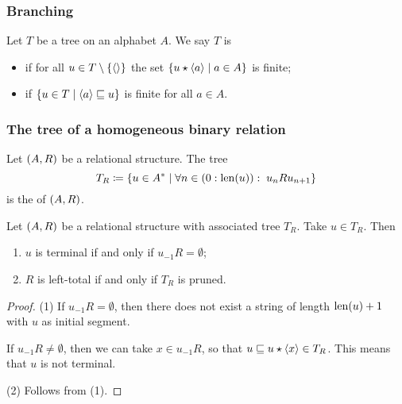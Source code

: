 \subsubsection{Branching}
\begin{definition}
Let $T$ be a tree on an alphabet $A$. We say $T$ is
\begin{itemize}
\item {} if for all $u\in T\setminus\{\left\langle  \right\rangle\}$ the set $\setbuilder{u\concat\seq{a}}{a\in A}$ is finite;
\item {} if $\setbuilder{u\in T}{\seq{a}\sqsubseteq u}$ is finite for all $a\in A$.
\end{itemize}
\end{definition}

\subsubsection{The tree of a homogeneous binary relation}
\begin{definition}
Let $\sSet{A,R}$ be a relational structure. The tree
\[ T_R \defeq \setbuilder{u\in A^*}{\forall n\in (0:\len(u)): \; u_nRu_{n+1}} \]
is the  of $\sSet{A,R}$.
\end{definition}

\begin{lemma} \label{relationalTreeLemma}
Let $\sSet{A,R}$ be a relational structure with associated tree $T_R$. Take $u\in T_R$. Then
\begin{enumerate}
\item $u$ is terminal \textup{if and only if} $u_{-1}R = \emptyset$;
\item $R$ is left-total \textup{if and only if} $T_R$ is pruned.
\end{enumerate}
\end{lemma}
\begin{proof}
(1) If $u_{-1}R = \emptyset$, then there does not exist a string of length $\operatorname{len}(u)+1$ with $u$ as initial segment.

If $u_{-1}R \neq \emptyset$, then we can take $x\in u_{-1}R$, so that $u \sqsubseteq u\star\left\langle x \right\rangle \in T_R$. This means that $u$ is not terminal.

(2) Follows from (1).
\end{proof}

